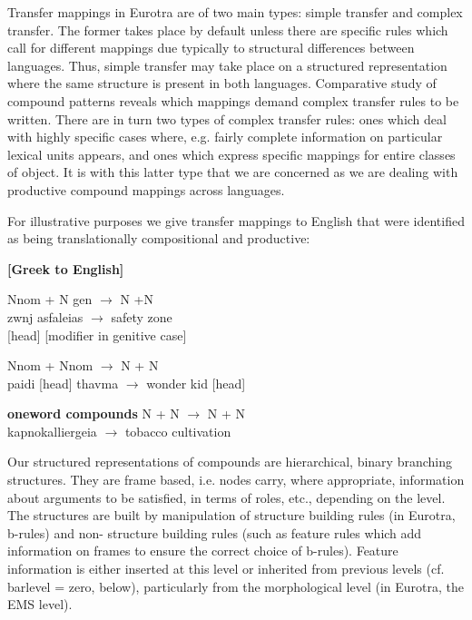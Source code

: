 Transfer   mappings  in Eurotra are of  two  main  types:  simple 
transfer and complex transfer.  The former takes place by default 
unless there are specific rules which call for different mappings 
due typically to structural differences between languages.  Thus, 
simple  transfer  may take place on a  structured  representation 
where   the   same  structure  is  present  in  both   languages. 
Comparative  study  of compound patterns reveals  which  mappings 
demand  complex  transfer  rules to  be  written. 
There are in turn two types of complex transfer rules: ones which 
deal  with  highly specific cases  where,  e.g.  fairly  complete 
information on particular lexical units appears,  and ones  which 
express  specific  mappings for entire classes of object.  It  is 
with  this  latter type that we are concerned as we  are  dealing 
with productive compound mappings across languages.

For illustrative purposes we give transfer mappings to
English that were identified as being translationally
compositional and productive:

{\bf [Greek to English]}
\begin{itemize}
{\em
\item  Nnom + N gen $\rightarrow$ N +N \\
    zwnj asfaleias  $\rightarrow$ safety zone \\
     {[head] [modifier in genitive case]} \\
\item  Nnom + Nnom $\rightarrow$  N + N \\
        paidi [head] thavma $\rightarrow$  wonder kid [head] \\
          
\item  {\bf oneword compounds}   N + N $\rightarrow$ N + N \\
        kapnokalliergeia $\rightarrow$ tobacco cultivation\\}
\end{itemize}


Our     structured      representations   of    compounds     are  
hierarchical, binary  
branching structures. They are frame based, i.e. nodes carry, where 
appropriate,  information  about arguments to  be  satisfied,  in 
terms  of  roles,  etc.,  depending on the  level. 
The structures  are built  by  manipulation 
of  structure  building  rules (in Eurotra,  b-rules)  and   non-
structure  building  rules  (such  as  feature  rules  which  add 
information on frames to ensure  the  correct choice of b-rules).  
Feature   information   is  either   inserted at  this  level  or 
inherited  from previous  levels (cf.  barlevel =  zero,  below), 
particularly  from the morphological level (in Eurotra,  the  EMS 
level).

